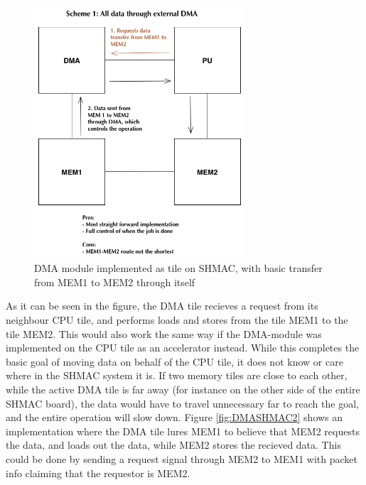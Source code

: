 \begin{figure}[h!]
    \centering
    \includegraphics[width=0.7\textwidth]{Figures/DMA/DMASHMAC1}
    \caption{DMA module implemented as tile on SHMAC, with basic transfer from MEM1 to MEM2 through itself}
    \label{fig:DMASHMAC1}
\end{figure}
 
As it can be seen in the figure, the DMA tile recieves a request from its neighbour CPU tile, and performs loads and stores from the tile MEM1 to the tile MEM2.
This would also work the same way if the DMA-module was implemented on the CPU tile as an accelerator instead.
While this completes the basic goal of moving data on behalf of the CPU tile, it does not know or care where in the SHMAC system it is.
If two memory tiles are close to each other, while the active DMA tile is far away (for instance on the other side of the entire SHMAC board), the data would have to travel unnecessary far to reach the goal, and the entire operation will slow down.
Figure \ref{fig:DMASHMAC2} shows an implementation where the DMA tile lures MEM1 to believe that MEM2 requests the data, and loads out the data, while MEM2 stores the recieved data.
This could be done by sending a request signal through MEM2 to MEM1 with packet info claiming that the requestor is MEM2. 

